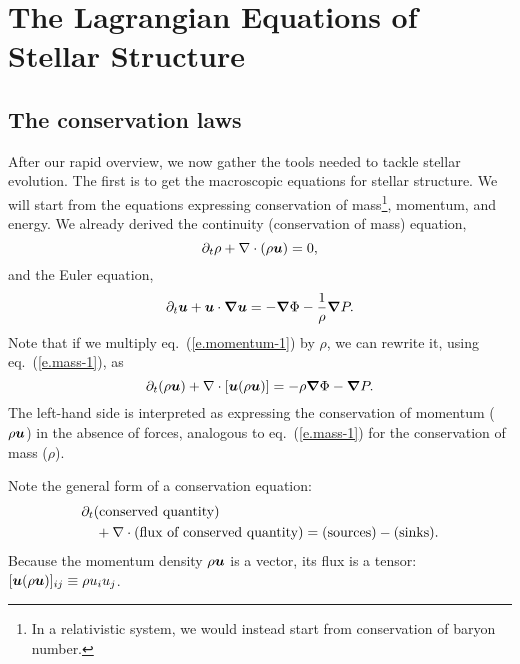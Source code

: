 \chapter[Stellar Structure Equations]{The Lagrangian Equations of Stellar Structure}
\label{ch.stellar-structure-eqn}

\section{The conservation laws}

After our rapid overview, we now gather the tools needed to tackle stellar evolution.  The first is to get the macroscopic equations for stellar structure. We will start from the equations expressing conservation of mass\footnote{In a relativistic system, we would instead start from conservation of baryon number.}, momentum, and energy. We already derived the continuity (conservation of mass) equation,
\begin{equation}\label{e.mass-1}
\partial_{t}\rho + \nabla \cdot(\rho\bm{u}) = 0,
\end{equation}
and the Euler equation,
\begin{equation}\label{e.momentum-1}
\partial_{t}\bm{u} + \bm{u}\cdot\bm{\nabla}\bm{u} = -\bm{\nabla} \Phi - \frac{1}{\rho}\bm{\nabla} P.
\end{equation}
Note that if we multiply eq.~(\ref{e.momentum-1}) by $\rho$, we can rewrite it, using eq.~(\ref{e.mass-1}), as
\begin{equation}\label{e.momentum-2}
	\partial_{t}(\rho\bm{u}) + \nabla \cdot[\bm{u}(\rho\bm{u})] = -\rho\bm{\nabla}\Phi -\bm{\nabla} P.
\end{equation}
The left-hand side is interpreted as expressing the conservation of momentum ($\rho\bm{u}$) in the absence of forces, analogous to eq.~(\ref{e.mass-1}) for the conservation of mass ($\rho$).

Note the general form of a conservation equation:
\begin{eqnarray*}
\lefteqn{\partial_{t}(\textrm{conserved quantity})}\\
 & & \mbox{} + \divr(\textrm{flux of conserved quantity}) =
 (\textrm{sources}) - (\textrm{sinks}).
\end{eqnarray*}
Because the momentum density $\rho\bm{u}$ is a vector, its flux is a tensor: $[\bm{u}(\rho\bm{u})]_{ij} \equiv \rho u_{i}u_{j}$.

